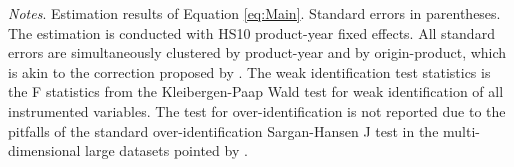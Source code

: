 \begin{adjustwidth}{-0.25in}{-0.0in}
\footnotesize {\it Notes}. Estimation results of Equation \eqref{eq:Main}. Standard errors in parentheses. The estimation is conducted with HS10 product-year fixed effects.
All standard errors are simultaneously clustered by product-year and by origin-product, which is akin to the correction proposed by \citet{adao2019shift}.
The weak identification test statistics is the F statistics from the Kleibergen-Paap Wald test for weak identification of all instrumented variables.
The test for over-identification is not reported due to the pitfalls of the standard over-identification Sargan-Hansen J test in the multi-dimensional large datasets pointed by \cite{AngrsitEtAl96}.
\end{adjustwidth}